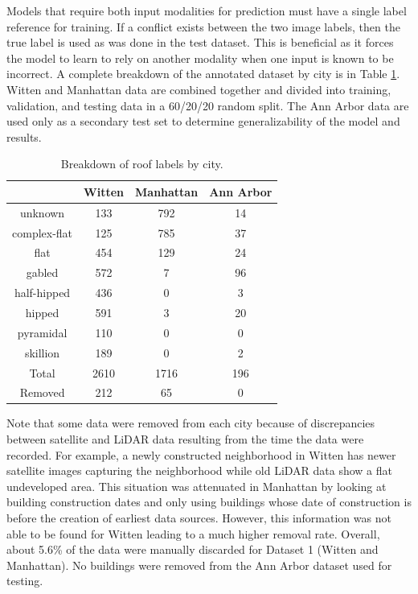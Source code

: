 Models that require both input modalities for prediction must have a single label reference for training. If a conflict exists between the two image labels, then the true label is used as was done in the test dataset.  This is beneficial as it forces the model to learn to rely on another modality when one input is known to be incorrect. A complete breakdown of the annotated dataset by city is in Table \ref{table:city_roofs}.  Witten and Manhattan data are combined together and divided into training, validation, and testing data in a 60/20/20 random split. The Ann Arbor data are used only as a secondary test set to determine generalizability of the model and results.


\begin{table}[ht]
\centering
\caption{Breakdown of roof labels by city.}\label{table:city_roofs}
\begin{tabular}{c@{\qquad}cc@{\qquad}c}
\toprule
\multirow{1}{*}{\raisebox{-\heavyrulewidth}{\textbf{Roof Shape}}} &
           \textbf{Witten }& \textbf{Manhattan} & \textbf{Ann Arbor} \\ \midrule
unknown              & 133    & 792      & 14        \\
complex-flat         & 125    & 785      & 37        \\
flat                 & 454    & 129      & 24        \\
gabled               & 572    & 7        & 96        \\
half-hipped          & 436    & 0        & 3         \\
hipped               & 591    & 3        & 20        \\
pyramidal            & 110    & 0        & 0         \\
skillion             & 189    & 0        & 2         \\
\midrule
Total       & 2610   & 1716     & 196       \\ 
Removed              & 212    & 65       & 0         \\
\bottomrule
\end{tabular}
\end{table}


Note that some data were removed from each city because of discrepancies between satellite and LiDAR data resulting from the time the data were recorded. For example, a newly constructed neighborhood in Witten has newer satellite images capturing the neighborhood while old LiDAR data show  a flat undeveloped area. This situation was attenuated in Manhattan by looking at building construction dates and only using buildings whose date of construction is before the creation of earliest data sources. However, this information was not able to be found for Witten leading to a much higher removal rate. Overall, about 5.6\% of the data were manually discarded for Dataset 1 (Witten and Manhattan).  No buildings were removed from the Ann Arbor dataset used for testing.

